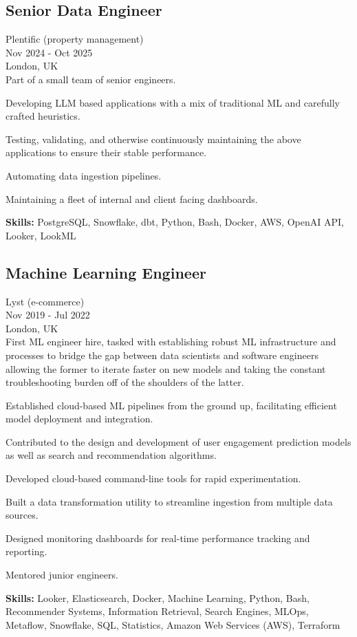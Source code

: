 \documentclass[a4paper,10pt]{article}
\begin{document}
\subsection*{Senior Data Engineer}
Plentific (property management) \\
Nov 2024 - Oct 2025 \\
London, UK \\
Part of a small team of senior engineers.
\begin{bulletlist}
    \item Developing LLM based applications with a mix of traditional ML and carefully crafted heuristics.
    \item Testing, validating, and otherwise continuously maintaining the above applications to ensure their stable performance.
    \item Automating data ingestion pipelines.
    \item Maintaining a fleet of internal and client facing dashboards.
\end{bulletlist}
\textbf{Skills:} PostgreSQL, Snowflake, dbt, Python, Bash, Docker, AWS, OpenAI API, Looker, LookML

\subsection*{Machine Learning Engineer}
Lyst (e-commerce) \\
Nov 2019 - Jul 2022 \\
London, UK \\
First ML engineer hire, tasked with establishing robust ML infrastructure and processes to bridge the gap between data scientists and software engineers allowing the former to iterate faster on new models and taking the constant troubleshooting burden off of the shoulders of the latter.
\begin{bulletlist}
    \item Established cloud-based ML pipelines from the ground up, facilitating efficient model deployment and integration.
    \item Contributed to the design and development of user engagement prediction models as well as search and recommendation algorithms.
    \item Developed cloud-based command-line tools for rapid experimentation.
    \item Built a data transformation utility to streamline ingestion from multiple data sources.
    \item Designed monitoring dashboards for real-time performance tracking and reporting.
    \item Mentored junior engineers.
\end{bulletlist}
\textbf{Skills:} Looker, Elasticsearch, Docker, Machine Learning, Python, Bash, Recommender Systems, Information Retrieval, Search Engines, MLOps, Metaflow, Snowflake, SQL, Statistics, Amazon Web Services (AWS), Terraform
\end{document}
